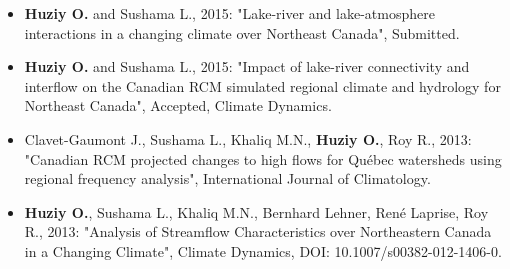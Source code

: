\vspace{\vertspace}


{
\renewcommand{\labelitemi}{}
\begin{itemize}

    \item \textbf{Huziy O.} and Sushama L., 2015: "Lake-river and
    lake-atmosphere interactions in a changing climate over Northeast Canada",
    Submitted.

    \item \textbf{Huziy O.} and Sushama L., 2015: "Impact of lake-river
    connectivity and interflow on the Canadian RCM simulated regional climate
    and hydrology for Northeast Canada", Accepted, Climate Dynamics.

    \item Clavet-Gaumont J., Sushama L., Khaliq M.N.,
    \textbf{Huziy O.}, Roy R., 2013: "Canadian RCM projected changes to high
    flows for Québec watersheds using regional frequency analysis", International Journal of Climatology.

    \item \textbf{Huziy O.}, Sushama L., Khaliq M.N., Bernhard
    Lehner, René Laprise, Roy R., 2013: "Analysis of Streamflow Characteristics over Northeastern Canada
     in a Changing Climate", Climate Dynamics, DOI:
     10.1007/s00382-012-1406-0.

\end{itemize}
}
